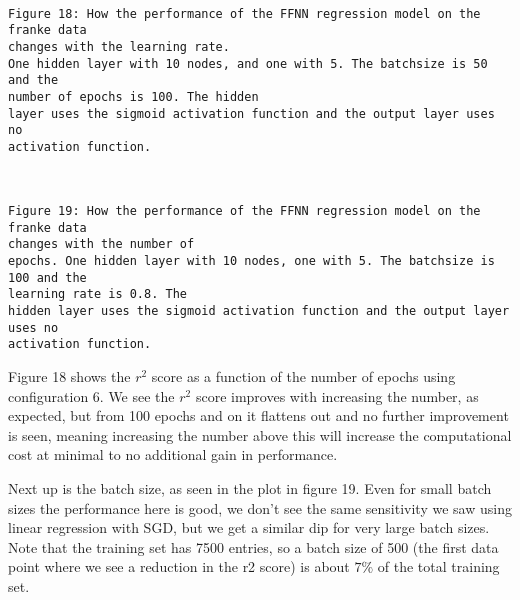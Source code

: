 \documentclass[11pt]{article}
\begin{document}
    \begin{center}
    \end{center}
    { \hspace*{\fill} \\}
   
    \begin{Verbatim}[commandchars=\\\{\}]
Figure 18: How the performance of the FFNN regression model on the franke data
changes with the learning rate.
One hidden layer with 10 nodes, and one with 5. The batchsize is 50 and the
number of epochs is 100. The hidden
layer uses the sigmoid activation function and the output layer uses no
activation function.
    \end{Verbatim}

    \begin{center}
    \end{center}
    { \hspace*{\fill} \\}
    
    \begin{Verbatim}[commandchars=\\\{\}]
Figure 19: How the performance of the FFNN regression model on the franke data
changes with the number of
epochs. One hidden layer with 10 nodes, one with 5. The batchsize is 100 and the
learning rate is 0.8. The
hidden layer uses the sigmoid activation function and the output layer uses no
activation function.
    \end{Verbatim}

    Figure 18 shows the \(r^2\) score as a function of the number of epochs
using configuration 6. We see the \(r^2\) score improves with increasing
the number, as expected, but from 100 epochs and on it flattens out and
no further improvement is seen, meaning increasing the number above this
will increase the computational cost at minimal to no additional gain in
performance.

Next up is the batch size, as seen in the plot in figure 19. Even for
small batch sizes the performance here is good, we don't see the same
sensitivity we saw using linear regression with SGD, but we get a
similar dip for very large batch sizes. Note that the training set has
7500 entries, so a batch size of 500 (the first data point where we see a
reduction in the r2 score) is about \(7\%\) of the total training set.
\end{document}
